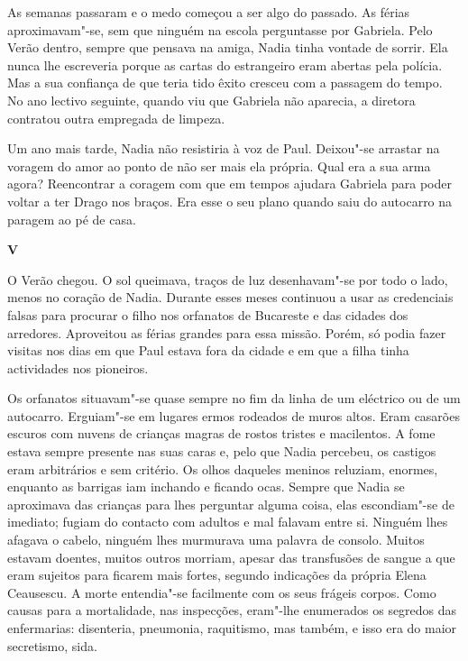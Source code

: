 As semanas passaram e o medo começou a ser algo do passado. As férias
aproximavam"-se, sem que ninguém na escola perguntasse por Gabriela. Pelo
Verão dentro, sempre que pensava na amiga, Nadia tinha vontade de
sorrir. Ela nunca lhe escreveria porque as cartas do estrangeiro eram
abertas pela polícia. Mas a sua confiança de que teria tido êxito
cresceu com a passagem do tempo. No ano lectivo seguinte, quando viu que
Gabriela não aparecia, a diretora contratou outra empregada de limpeza.

Um ano mais tarde, Nadia não resistiria à voz de Paul. Deixou"-se
arrastar na voragem do amor ao ponto de não ser mais ela própria. Qual
era a sua arma agora? Reencontrar a coragem com que em tempos ajudara
Gabriela para poder voltar a ter Drago nos braços. Era esse o seu plano
quando saiu do autocarro na paragem ao pé de casa.


\pagebreak
\movetooddpage
\vspace*{1.8cm}
\noindent{}\textbf{V}

\bigskip

O Verão chegou. O sol queimava, traços de luz desenhavam"-se por todo o
lado, menos no coração de Nadia. Durante esses meses continuou a usar as
credenciais falsas para procurar o filho nos orfanatos de Bucareste e
das cidades dos arredores. Aproveitou as férias grandes para essa
missão. Porém, só podia fazer visitas nos dias em que Paul estava fora
da cidade e em que a filha tinha actividades nos pioneiros.

Os orfanatos situavam"-se quase sempre no fim da linha de um eléctrico ou
de um autocarro. Erguiam"-se em lugares ermos rodeados de muros altos.
Eram casarões escuros com nuvens de crianças magras de rostos tristes e
macilentos. A fome estava sempre presente nas suas caras e, pelo que
Nadia percebeu, os castigos eram arbitrários e sem critério. Os olhos
daqueles meninos reluziam, enormes, enquanto as barrigas iam inchando e
ficando ocas. Sempre que Nadia se aproximava das crianças para lhes
perguntar alguma coisa, elas escondiam"-se de imediato; fugiam do
contacto com adultos e mal falavam entre si. Ninguém lhes afagava o
cabelo, ninguém lhes murmurava uma palavra
de consolo. Muitos estavam doentes, muitos outros morriam, apesar das
transfusões de sangue a que eram sujeitos para ficarem mais fortes,
segundo indicações da própria Elena Ceausescu. A morte entendia"-se
facilmente com os seus frágeis corpos. Como causas para a mortalidade,
nas inspecções, eram"-lhe enumerados os segredos das enfermarias:
disenteria, pneumonia, raquitismo, mas também, e isso era do maior
secretismo, sida.

